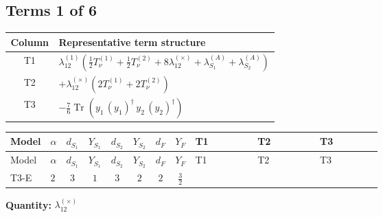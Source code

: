 \documentclass[8pt]{article}
\begin{document}
\begin{landscape}
\subsection*{Terms 1 of 6}
\begin{center}
\begin{tabular}{@{}c >{\raggedright\arraybackslash}p{0.82\linewidth}@{}}
\toprule
Column & Representative term structure \\
\midrule
T1 & \(\displaystyle {\lambda_{12}^{(1)}} \left(\frac{1}{2} T_{\nu}^{(1)}+\frac{1}{2} T_{\nu}^{(2)}+8 {\lambda_{12}^{(\times)}}+{\lambda_{S_1}^{(A)}}+{\lambda_{S_2}^{(A)}}\right)\) \\
\midrule
T2 & \(\displaystyle +{\lambda_{12}^{(\times)}} (2 T_{\nu}^{(1)}+2 T_{\nu}^{(2)})\) \\
\midrule
T3 & \(\displaystyle -\frac{7}{6} \operatorname{Tr}\!\left({y_1}\,\left({y_1}\right)^{\dagger}\,{y_2}\,\left({y_2}\right)^{\dagger}\right)\) \\
\midrule
\bottomrule
\end{tabular}
\end{center}
\smallskip
\tiny
\begin{longtable}{@{}llcccccc >{\raggedright\arraybackslash}p{0.21\linewidth} >{\raggedright\arraybackslash}p{0.21\linewidth} >{\raggedright\arraybackslash}p{0.21\linewidth}@{}}
\toprule
Model & $\alpha$ & $d_{S_1}$ & $Y_{S_1}$ & $d_{S_2}$ & $Y_{S_2}$ & $d_F$ & $Y_F$ & T1 & T2 & T3 \\
\midrule
\endfirsthead
\toprule
Model & $\alpha$ & $d_{S_1}$ & $Y_{S_1}$ & $d_{S_2}$ & $Y_{S_2}$ & $d_F$ & $Y_F$ & T1 & T2 & T3 \\
\midrule
\endhead
T3-E & $2$ & $3$ & $1$ & $3$ & $2$ & $2$ & $\frac{3}{2}$ & \scriptsize\adjustbox{max width=\linewidth}{$\begin{gathered} {\lambda_{12}^{(1)}} \left(\frac{1}{2} T_{\nu}^{(1)}+\frac{1}{2} T_{\nu}^{(2)}+8 {\lambda_{12}^{(\times)}}+{\lambda_{S_1}^{(A)}}+{\lambda_{S_2}^{(A)}}\right)\end{gathered}$} & \scriptsize\adjustbox{max width=\linewidth}{$\begin{gathered} +{\lambda_{12}^{(\times)}} (2 T_{\nu}^{(1)}+2 T_{\nu}^{(2)})\end{gathered}$} & \scriptsize\adjustbox{max width=\linewidth}{$\begin{gathered} -\frac{7}{6} \operatorname{Tr}\!\left({y_1}\,\left({y_1}\right)^{\dagger}\,{y_2}\,\left({y_2}\right)^{\dagger}\right)\end{gathered}$} \\
\midrule
\bottomrule
\end{longtable}
\clearpage
\noindent\textbf{Quantity: }$\lambda_{12}^{(\times)}$\par\smallskip

\end{landscape}
\end{document}
